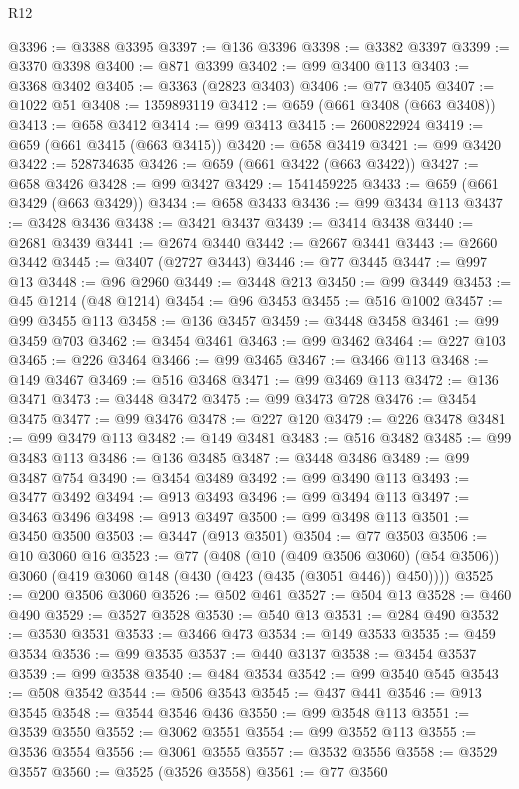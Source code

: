 \begin{lexlean}{R12}
\begin{coremodule}
{{{{{{{{{{{{{{{{{{{{{{{{{{{{{{{{{{{{{{{{{{{{{{{{{{{{{{{{{{{{{{{{{{{{{{{{{{{{{{{{{{{{{{{{{{{{{{{{{{{{{{{{{{@3396 := @3388 @3395
@3397 := @136 @3396
@3398 := @3382 @3397
@3399 := @3370 @3398
@3400 := @871 @3399
@3402 := @99 @3400 @113
@3403 := @3368 @3402
@3405 := @3363 (@2823 @3403)
@3406 := @77 @3405
@3407 := @1022 @51
@3408 := 1359893119
@3412 := @659 (@661 @3408 (@663 @3408))
@3413 := @658 @3412
@3414 := @99 @3413
@3415 := 2600822924
@3419 := @659 (@661 @3415 (@663 @3415))
@3420 := @658 @3419
@3421 := @99 @3420
@3422 := 528734635
@3426 := @659 (@661 @3422 (@663 @3422))
@3427 := @658 @3426
@3428 := @99 @3427
@3429 := 1541459225
@3433 := @659 (@661 @3429 (@663 @3429))
@3434 := @658 @3433
@3436 := @99 @3434 @113
@3437 := @3428 @3436
@3438 := @3421 @3437
@3439 := @3414 @3438
@3440 := @2681 @3439
@3441 := @2674 @3440
@3442 := @2667 @3441
@3443 := @2660 @3442
@3445 := @3407 (@2727 @3443)
@3446 := @77 @3445
@3447 := @997 @13
@3448 := @96 @2960
@3449 := @3448 @213
@3450 := @99 @3449
@3453 := @45 @1214 (@48 @1214)
@3454 := @96 @3453
@3455 := @516 @1002
@3457 := @99 @3455 @113
@3458 := @136 @3457
@3459 := @3448 @3458
@3461 := @99 @3459 @703
@3462 := @3454 @3461
@3463 := @99 @3462
@3464 := @227 @103
@3465 := @226 @3464
@3466 := @99 @3465
@3467 := @3466 @113
@3468 := @149 @3467
@3469 := @516 @3468
@3471 := @99 @3469 @113
@3472 := @136 @3471
@3473 := @3448 @3472
@3475 := @99 @3473 @728
@3476 := @3454 @3475
@3477 := @99 @3476
@3478 := @227 @120
@3479 := @226 @3478
@3481 := @99 @3479 @113
@3482 := @149 @3481
@3483 := @516 @3482
@3485 := @99 @3483 @113
@3486 := @136 @3485
@3487 := @3448 @3486
@3489 := @99 @3487 @754
@3490 := @3454 @3489
@3492 := @99 @3490 @113
@3493 := @3477 @3492
@3494 := @913 @3493
@3496 := @99 @3494 @113
@3497 := @3463 @3496
@3498 := @913 @3497
@3500 := @99 @3498 @113
@3501 := @3450 @3500
@3503 := @3447 (@913 @3501)
@3504 := @77 @3503
@3506 := @10 @3060 @16
@3523 := @77
    (@408
      (@10 (@409 @3506 @3060) (@54 @3506))
      @3060
      (@419 @3060 @148 (@430 (@423 (@435 (@3051 @446)) @450))))
@3525 := @200 @3506 @3060
@3526 := @502 @461
@3527 := @504 @13
@3528 := @460 @490
@3529 := @3527 @3528
@3530 := @540 @13
@3531 := @284 @490
@3532 := @3530 @3531
@3533 := @3466 @473
@3534 := @149 @3533
@3535 := @459 @3534
@3536 := @99 @3535
@3537 := @440 @3137
@3538 := @3454 @3537
@3539 := @99 @3538
@3540 := @484 @3534
@3542 := @99 @3540 @545
@3543 := @508 @3542
@3544 := @506 @3543
@3545 := @437 @441
@3546 := @913 @3545
@3548 := @3544 @3546 @436
@3550 := @99 @3548 @113
@3551 := @3539 @3550
@3552 := @3062 @3551
@3554 := @99 @3552 @113
@3555 := @3536 @3554
@3556 := @3061 @3555
@3557 := @3532 @3556
@3558 := @3529 @3557
@3560 := @3525 (@3526 @3558)
@3561 := @77 @3560
}}}}}}}}}}}}}}}}}}}}}}}}}}}}}}}}}}}}}}}}}}}}}}}}}}}}}}}}}}}}}}}}}}}}}}}}}}}}}}}}}}}}}}}}}}}}}}}}}}}}}}}}}}
\end{coremodule}
\end{lexlean}
